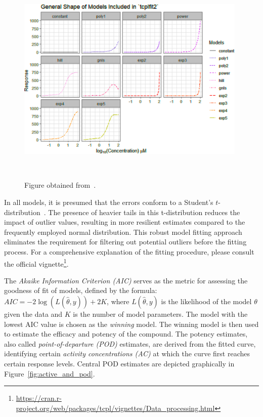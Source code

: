 \begin{figure}
    \centering
    \includegraphics[width=0.98\textwidth]{figures/fit_models.png}
    \caption{Figure obtained from~\cite{tcplv3.0}.}
~\label{fig:tcplfit2_models}
\end{figure}

In all models, it is presumed that the errors conform to a Student's $t$-distribution~\cite{tcplv3.0}. The presence of heavier tails in this t-distribution reduces the impact of outlier values, resulting in more resilient estimates compared to the frequently employed normal distribution. This robust model fitting approach eliminates the requirement for filtering out potential outliers before the fitting process. For a comprehensive explanation of the fitting procedure, please consult the official vignette\footnote{\url{https://cran.r-project.org/web/packages/tcpl/vignettes/Data_processing.html}}.

The \emph{Akaike Information Criterion (AIC)} serves as the metric for assessing the goodness of fit of models, defined by the formula: $AIC = -2\log(L(\hat{\theta}, y)) + 2K$, where $L(\hat{\theta}, y)$ is the likelihood of the model $\theta$ given the data and $K$ is the number of model parameters. The model with the lowest AIC value is chosen as the \emph{winning} model. The winning model is then used to estimate the efficacy and potency of the compound. The potency estimates, also called \emph{point-of-departure (POD)} estimates, are derived from the fitted curve, identifying certain \emph{activity concentrations (AC)} at which the curve first reaches certain response levels. Central POD estimates are depicted graphically in Figure~\ref{fig:active_and_pod}.

